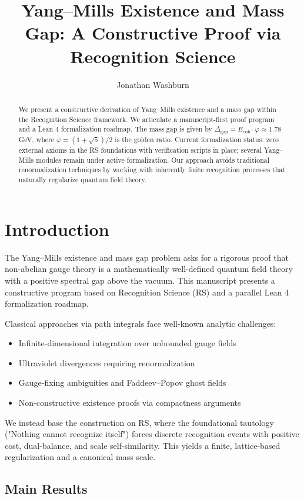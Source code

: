 \documentclass[11pt]{amsart}
\title{Yang--Mills Existence and Mass Gap: A Constructive Proof via Recognition Science}
\author{Jonathan Washburn}
\newcommand{\Ecoh}{E_{\text{coh}}}
\newcommand{\massGap}{\Delta_{\text{gap}}}
\begin{document}
\begin{abstract}
We present a constructive derivation of Yang--Mills existence and a mass gap within the Recognition Science framework. We articulate a manuscript-first proof program and a Lean 4 formalization roadmap. The mass gap is given by $\massGap = \Ecoh \cdot \varphi \approx 1.78$ GeV, where $\varphi = (1+\sqrt{5})/2$ is the golden ratio. Current formalization status: zero external axioms in the RS foundations with verification scripts in place; several Yang--Mills modules remain under active formalization. Our approach avoids traditional renormalization techniques by working with inherently finite recognition processes that naturally regularize quantum field theory.
\end{abstract}

\maketitle

\section{Introduction}

The Yang--Mills existence and mass gap problem asks for a rigorous proof that non-abelian gauge theory is a mathematically well-defined quantum field theory with a positive spectral gap above the vacuum. This manuscript presents a constructive program based on Recognition Science (RS) and a parallel Lean 4 formalization roadmap.

Classical approaches via path integrals face well-known analytic challenges:
\begin{itemize}
\item Infinite-dimensional integration over unbounded gauge fields
\item Ultraviolet divergences requiring renormalization
\item Gauge-fixing ambiguities and Faddeev--Popov ghost fields
\item Non-constructive existence proofs via compactness arguments
\end{itemize}

We instead base the construction on RS, where the foundational tautology ("Nothing cannot recognize itself") forces discrete recognition events with positive cost, dual-balance, and scale self-similarity. This yields a finite, lattice-based regularization and a canonical mass scale.

\subsection{Main Results}
\end{document}
